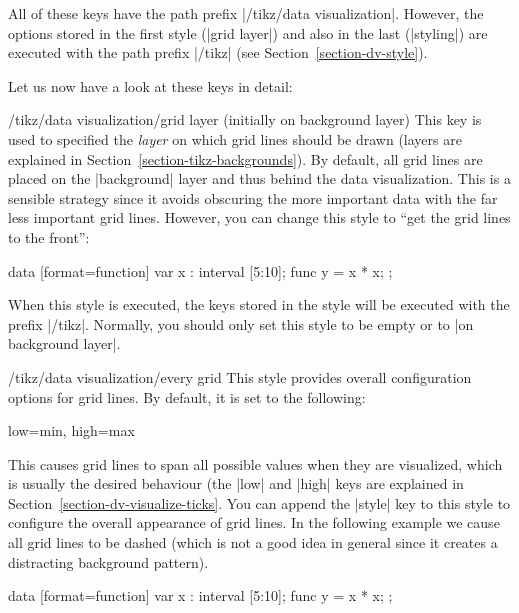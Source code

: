 All of these keys have the path prefix
|/tikz/data visualization|. However, the options stored in the first
style (|grid layer|) and also in the last (|styling|) are executed
with the path prefix |/tikz| (see Section~\ref{section-dv-style}).

Let us now have a look at these keys in detail:

\begin{stylekey}{/tikz/data visualization/grid layer (initially on background layer)}
  This key is used to specified the \emph{layer} on which grid lines
  should be drawn (layers are explained in
  Section~\ref{section-tikz-backgrounds}). By default, all grid lines
  are placed on the |background| layer and thus behind the data
  visualization. This is a sensible strategy since it avoids obscuring
  the more important data with the far less important grid
  lines. However, you can change this style to ``get the grid lines to
  the front'':
\begin{codeexample}[]
\tikz \datavisualization
  [scientific axes,
   all axes={
     length=3cm,
     grid,
     grid={minor steps between steps}
   },
   grid layer/.style=, %
   visualize as line]
  data [format=function] {
    var x : interval [5:10];
    func y = \value x * \value x;
  };
\end{codeexample}   
  When this style is executed, the keys stored in the style will be
  executed with the prefix |/tikz|. Normally, you should only set this
  style to be empty or to |on background layer|.
\end{stylekey}

\begin{stylekey}{/tikz/data visualization/every grid}
  This style provides overall configuration options for grid lines. By
  default, it is set to the following:
\begin{codeexample}
low=min, high=max
\end{codeexample}
  This causes grid lines to span all possible values when they are
  visualized, which is usually the desired behaviour (the |low| and
  |high| keys are explained in
  Section~\ref{section-dv-visualize-ticks}. You can append 
  the |style| key to this style to configure the overall appearance of
  grid lines. In the following example we cause all grid lines to be
  dashed (which is not a good idea in general since it creates a
  distracting background pattern).
\begin{codeexample}[]
\tikz \datavisualization
  [scientific axes,
   all axes={length=3cm, grid},
   every grid/.append style={style=densely dashed},
   visualize as line]
  data [format=function] {
    var x : interval [5:10];
    func y = \value x * \value x;
  };
\end{codeexample}   
\end{stylekey}

